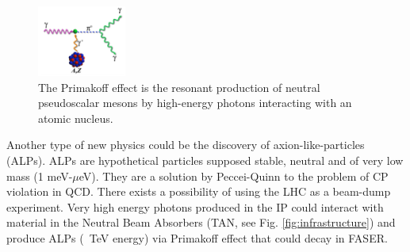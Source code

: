 \begin{figure}
  \centering
    \includegraphics[width=0.26\textwidth]{Primakoff.png}
    \caption[Primakoff Effect]{The Primakoff effect is the resonant production of neutral pseudoscalar mesons by high-energy photons interacting with an atomic nucleus. \cite{kang_standard_1978}}
    \label{fig:Primakoff}
\end{figure}

Another type of new physics could be the discovery of axion-like-particles (ALPs). ALPs are hypothetical particles supposed stable, neutral and of very low mass (1 meV-$\mu$eV). They are a solution by Peccei-Quinn to the problem of CP violation in QCD.
There exists a possibility of using the LHC as a beam-dump experiment. Very high energy photons produced in the IP could interact with material in the Neutral Beam Absorbers (TAN, see Fig. \ref{fig:infrastructure}) and produce ALPs (~TeV energy) via Primakoff effect that could decay in FASER.




